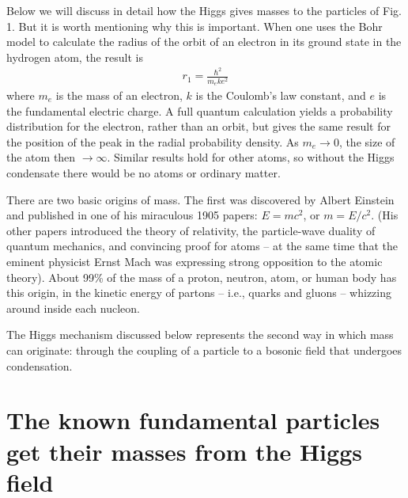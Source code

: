 \documentclass[12pt]{iopart}
\begin{document}
Below we will discuss in detail how the Higgs gives masses to the particles of Fig. 1. But it is worth mentioning why this is important. When one uses the Bohr model to calculate the radius of the orbit of an electron in its ground state in the hydrogen atom, the result is 
\begin{eqnarray}
r_1 = \frac{\hbar^2}{m_e k e^2} 
\label{eq1.1}
\end{eqnarray}
where $m_e$ is the mass of an electron, $k$ is the Coulomb's law constant, and $e$ is the fundamental electric charge. A full quantum calculation yields a probability distribution for the electron, rather than an orbit,  but gives the same result for the position of the peak in the radial probability density. As $m_e \rightarrow 0$,  the size of the atom then $\rightarrow \infty$. Similar results hold for other atoms, so without the Higgs condensate there would be no atoms or ordinary matter.

There are two basic origins of mass. The first was discovered by Albert Einstein and published in one of his miraculous 1905 papers: $E=mc^2$, or $m=E/c^2$.  (His other papers introduced the theory of relativity, the particle-wave duality of quantum mechanics, and convincing proof for atoms -- at the same time that the eminent physicist Ernst Mach was expressing strong opposition to the atomic theory). About 99\% of the mass of a proton, neutron, atom, or human body has this origin, in the kinetic energy of partons -- i.e., quarks and gluons -- whizzing around inside each nucleon. 

The Higgs mechanism discussed below represents the second way in which mass can originate: through the coupling of a particle to a bosonic field that undergoes condensation. 

\section{\label{sec:sec2} The known fundamental particles get their masses from the Higgs field}
\end{document}

